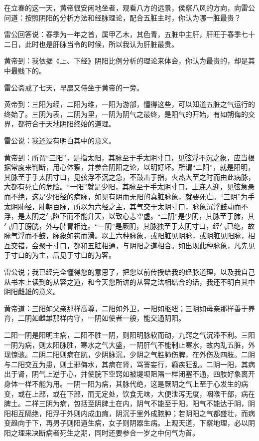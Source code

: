\documentclass[a4paper,12pt,UTF8,twoside]{ctexbook}
\begin{document}
在立春的这一天，黄帝很安闲地坐者，观看八方的远景，侯察八风的方向，向雷公问道：按照阴阳的分析方法和经脉理论，配合五脏主时，你认为哪一脏最贵？

雷公回答说：春季为一年之首，属甲乙木，其色青，五脏中主肝，肝旺于春季七十二日，此时也是肝脉当令的时候，所以我认为肝脏最贵。

黄帝到：我依据《上、下经》阴阳比例分析的理论来体会，你认为最贵的，却是其中最贱下的。

雷公斋戒了七天，早晨又侍坐于黄帝的一旁。

黄帝到：三阳为经，二阳为维，一阳为游部，懂得这些，可以知道五脏之气运行的终始了。三阴为表，二阴为里，一阴为阴气之最终，是阳气的开始，有如朔侮的交界，都符合于天地阴阳终始的道理。

雷公说：我还没有明白其中的意义。

黄帝到：所谓“三阳”，是指太阳，其脉至于手太阴寸口，见弦浮不沉之象，应当根据常度来判断，用心体察，并参合阴阳之论，以明好坏。所谓“二阳”，就是阳明，其脉至于手太阴寸口，见弦浮不沉之急，不鼓击于指，火热大至之时而由此病脉，大都有死亡的危险。“一阳”就是少阳，其脉至于手太阴寸口，上连人迎，见弦急悬而不绝，这是少阳经的病脉，如见有阴而无阳的真脏脉象，就要死亡。“三阴”为手太阴肺经，肺朝百脉，所以为六经之主，其气交于太阴寸口，脉象沉浮鼓动而不浮，是太阴之气陷下而不能升天，以致心志空虚。“二阴”是少阴，其脉至于肺，其气归于膀胱，外与脾胃相连。“一阴”是厥阴，其脉独至于太阴寸口，经气已绝，故脉气浮而不鼓，脉象如钩而滑。以上六种脉象，或阳脏见阴脉，或阴脏见阳脉，相互交错，会聚于寸口，都和五脏相通，与阴阳之道相合。如出现此种脉象，凡先见于寸口的为主，后见于寸口的为客。

雷公说；我已经完全懂得您的意思了，把您以前传授给我的经脉道理，以及我自己从书本上读到的从容之道，和今天您所讲的从容之法相结合的话，我还不明白其中阴阳雌雄的意义。

黄帝道：三阳如父亲那样高尊，二阳如外卫，一阳如枢纽；三阴如母亲那样善于养育，二阴如雌雄那样内守，一阴如使者一般，能交通阴阳。

二阳一阴是阳明主病，二阳不胜一阴，则阳明脉软而动，九窍之气沉滞不利。三阳一阴为病，则太阳脉胜，寒水之气大盛，一阴肝气不能制止寒水，故内乱五脏，外现惊骇。二阴二阳则病在肮，少阴脉沉，少阴之气胜肺伤脾，在外伤及四肢。二阴与二阳交互为患，则土邪侮水，其病在肾，骂詈妄行，癫疾狂乱。二阴一阳，其病出于肾，阴气上逆于心，并使脘下空窍如被堤坝阻隔一样闭塞不通，四肢好象离开身体一样不能为用。一阴一阳为病，其脉代绝，这是厥阴之气上至于心发生的病变，或在上部，或在下部，而无定处，饮食无味，大便泄泻无度，咽喉干部，病在脾土。二样三阴为病，包括至阴脾土在内，阴气不能至于阳，阳气不能达于阴，阴阳相互隔绝，阳浮于外则内成血瘕，阴沉于里外成脓肿；若阴阳之气都盛壮，而病变趋向于下，再男子则阳道生病，女子则阴器生病。上观天道，下察地理，必以阴阳之理来决断病者死生之期，同时还要参合一岁之中何气为首。
\end{document}
